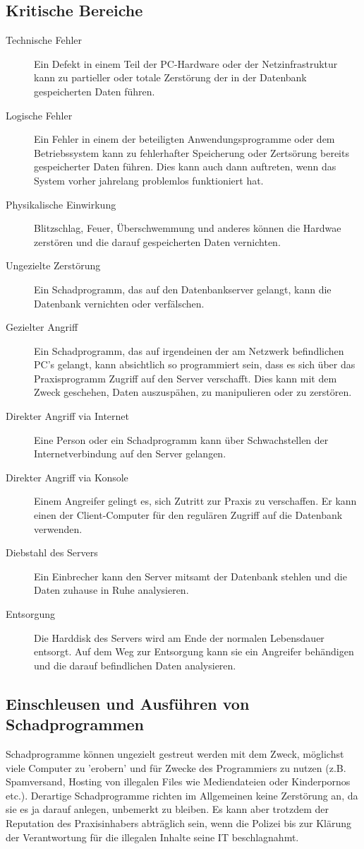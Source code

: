 \documentclass[a4paper]{scrartcl}
\begin{document}
\subsection{Kritische Bereiche}
\begin{description}
\item [Technische Fehler] Ein Defekt in einem Teil der PC-Hardware oder der Netzinfrastruktur kann zu partieller oder totale Zerstörung der in der Datenbank gespeicherten Daten führen.
\item [Logische Fehler] Ein Fehler in einem der beteiligten Anwendungsprogramme oder dem Betriebssystem kann zu fehlerhafter Speicherung oder Zertsörung bereits gespeicherter Daten führen. Dies kann auch dann auftreten, wenn das System vorher jahrelang problemlos funktioniert hat.
\item [Physikalische Einwirkung] Blitzschlag, Feuer, Überschwemmung und anderes können die Hardwae zerstören und die darauf gespeicherten Daten vernichten.
\item [Ungezielte Zerstörung] Ein Schadprogramm, das auf den Datenbankserver gelangt, kann die Datenbank vernichten oder verfälschen.
\item [Gezielter Angriff] Ein Schadprogramm, das auf irgendeinen der am Netzwerk befindlichen PC's gelangt, kann absichtlich so programmiert sein, dass es sich über das Praxisprogramm Zugriff auf den Server verschafft. Dies kann mit dem Zweck geschehen, Daten auszuspähen, zu manipulieren oder zu zerstören.
\item [Direkter Angriff via Internet] Eine Person oder ein Schadprogramm kann über Schwachstellen der Internetverbindung auf den Server gelangen.
\item [Direkter Angriff via Konsole] Einem Angreifer gelingt es, sich Zutritt zur Praxis zu verschaffen. Er kann einen der Client-Computer für den regulären Zugriff auf die Datenbank verwenden.
\item [Diebstahl des Servers] Ein Einbrecher kann den Server mitsamt der Datenbank stehlen und die Daten zuhause in Ruhe analysieren.
\item [Entsorgung] Die Harddisk des Servers wird am Ende der normalen Lebensdauer entsorgt. Auf dem Weg zur Entsorgung kann sie ein Angreifer behändigen und die darauf befindlichen Daten analysieren.
\end{description}

\subsection{Einschleusen und Ausführen von Schadprogrammen}
Schadprogramme können ungezielt gestreut werden mit dem Zweck, möglichst viele Computer zu 'erobern' und für Zwecke des Programmiers zu nutzen (z.B. Spamversand, Hosting von illegalen Files wie Mediendateien oder Kinderpornos etc.). Derartige Schadprogramme richten im Allgemeinen keine Zerstörung an, da sie es ja darauf anlegen, unbemerkt zu bleiben. Es kann aber trotzdem der Reputation des Praxisinhabers abträglich sein, wenn die Polizei bis zur Klärung der Verantwortung für die illegalen Inhalte seine IT beschlagnahmt.
\end{document}
